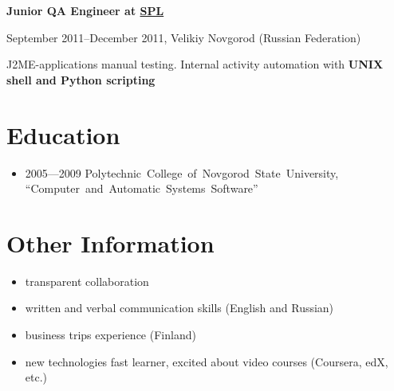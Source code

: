 \vspace{5pt}

{
\fontsize{12pt}{12pt}\selectfont
\bfseries Junior QA Engineer at
\href{http://spl.co}{\bfseries SPL\mdseries}
\mdseries
}

{
\fontsize{9pt}{8pt}\selectfont
September 2011--December 2011, Velikiy Novgorod (Russian Federation)
}

J2ME-applications manual testing. Internal activity automation with
\bfseries UNIX shell \mdseries and \bfseries Python \mdseries scripting

\section*{Education}
\begin{itemize}
\item 2005---2009 Polytechnic~College~of~Novgorod~State~University,
``Computer~and~Automatic~Systems~Software''
\end{itemize}

\section*{Other Information}
\begin{itemize}
\item transparent collaboration
\item written and verbal communication skills (English and Russian)
\item business trips experience (Finland)
\item new technologies fast learner, excited about video courses (Coursera, edX, etc.)
\end{itemize}

